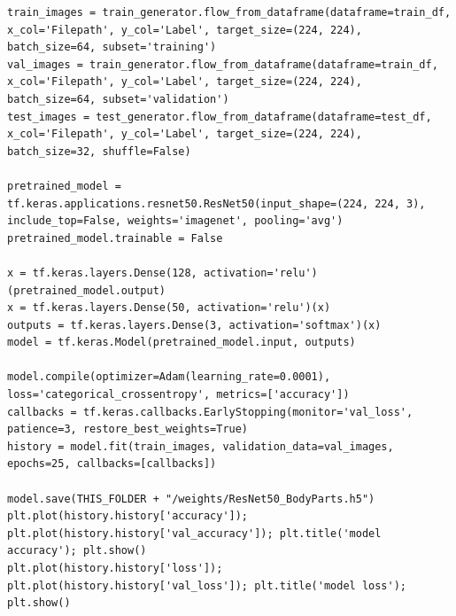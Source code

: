 \documentclass[a4paper,12pt]{report}
\begin{document}
\begin{lstlisting}[style=pythonstyle]
train_images = train_generator.flow_from_dataframe(dataframe=train_df, x_col='Filepath', y_col='Label', target_size=(224, 224), batch_size=64, subset='training')
val_images = train_generator.flow_from_dataframe(dataframe=train_df, x_col='Filepath', y_col='Label', target_size=(224, 224), batch_size=64, subset='validation')
test_images = test_generator.flow_from_dataframe(dataframe=test_df, x_col='Filepath', y_col='Label', target_size=(224, 224), batch_size=32, shuffle=False)

pretrained_model = tf.keras.applications.resnet50.ResNet50(input_shape=(224, 224, 3), include_top=False, weights='imagenet', pooling='avg')
pretrained_model.trainable = False

x = tf.keras.layers.Dense(128, activation='relu')(pretrained_model.output)
x = tf.keras.layers.Dense(50, activation='relu')(x)
outputs = tf.keras.layers.Dense(3, activation='softmax')(x)
model = tf.keras.Model(pretrained_model.input, outputs)

model.compile(optimizer=Adam(learning_rate=0.0001), loss='categorical_crossentropy', metrics=['accuracy'])
callbacks = tf.keras.callbacks.EarlyStopping(monitor='val_loss', patience=3, restore_best_weights=True)
history = model.fit(train_images, validation_data=val_images, epochs=25, callbacks=[callbacks])

model.save(THIS_FOLDER + "/weights/ResNet50_BodyParts.h5")
plt.plot(history.history['accuracy']); plt.plot(history.history['val_accuracy']); plt.title('model accuracy'); plt.show()
plt.plot(history.history['loss']); plt.plot(history.history['val_loss']); plt.title('model loss'); plt.show()
    \end{lstlisting}
\end{document}
